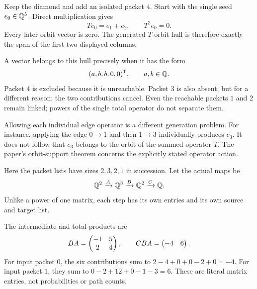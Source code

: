 Keep the diamond and add an isolated packet $4$. Start with the single seed $e_0\in\mathbb Q^5$. Direct multiplication gives
\[
Te_0=e_1+e_2,\qquad T^2e_0=0.
\]
Every later orbit vector is zero. The generated $T$-orbit hull is therefore exactly the span of the first two displayed columns.


A vector belongs to this hull precisely when it has the form
\[
(a,b,b,0,0)^\mathsf T,\qquad a,b\in\mathbb Q.
\]
Packet $4$ is excluded because it is unreachable. Packet $3$ is also absent, but for a different reason: the two contributions cancel. Even the reachable packets $1$ and $2$ remain linked; powers of the single total operator do not separate them.

Allowing each individual edge operator is a different generation problem. For instance, applying the edge $0\to1$ and then $1\to3$ individually produces $e_3$. It does not follow that $e_3$ belongs to the orbit of the summed operator $T$. The paper's orbit-support theorem concerns the explicitly stated operator action.


Here the packet lists have sizes $2,3,2,1$ in succession. Let the actual maps be
\[
\mathbb Q^2\xrightarrow{A}\mathbb Q^3\xrightarrow{B}\mathbb Q^2\xrightarrow{C}\mathbb Q.
\]
Unlike a power of one matrix, each step has its own entries and its own source and target list.


The intermediate and total products are
\[
BA=\begin{pmatrix}-1&5\\2&4\end{pmatrix},\qquad CBA=\begin{pmatrix}-4&6\end{pmatrix}.
\]
For input packet $0$, the six contributions sum to $2-4+0+0-2+0=-4$. For input packet $1$, they sum to $0-2+12+0-1-3=6$. These are literal matrix entries, not probabilities or path counts.


